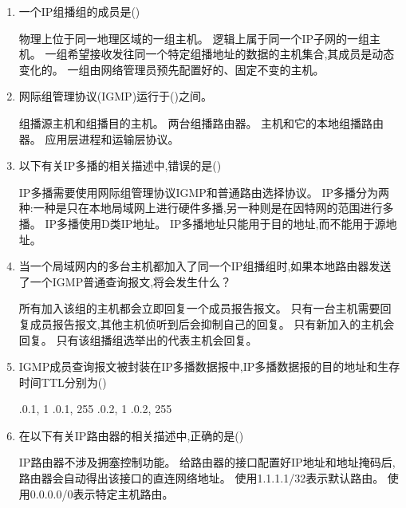 \documentclass[12pt, a4paper, oneside, UTF8]{ctexbook}
\begin{document}
\begin{enumerate}
    \item 一个IP组播组的成员是(\qquad)
    \begin{choices}[1]
    \task 物理上位于同一地理区域的一组主机。
    \task 逻辑上属于同一个IP子网的一组主机。
    \task 一组希望接收发往同一个特定组播地址的数据的主机集合,其成员是动态变化的。
    \task 一组由网络管理员预先配置好的、固定不变的主机。
    \end{choices}

    \item 网际组管理协议(IGMP)运行于()之间。
    \begin{choices}[1]
    \task 组播源主机和组播目的主机。
    \task 两台组播路由器。
    \task 主机和它的本地组播路由器。
    \task 应用层进程和运输层协议。
    \end{choices}

    \item 以下有关IP多播的相关描述中,错误的是(\qquad)
    \begin{choices}[1]
    \task IP多播需要使用网际组管理协议IGMP和普通路由选择协议。
    \task IP多播分为两种:一种是只在本地局域网上进行硬件多播,另一种则是在因特网的范围进行多播。
    \task IP多播使用D类IP地址。
    \task IP多播地址只能用于目的地址,而不能用于源地址。
    \end{choices}

    \item 当一个局域网内的多台主机都加入了同一个IP组播组时,如果本地路由器发送了一个IGMP普通查询报文,将会发生什么？
    \begin{choices}[1]
    \task 所有加入该组的主机都会立即回复一个成员报告报文。
    \task 只有一台主机需要回复成员报告报文,其他主机侦听到后会抑制自己的回复。
    \task 只有新加入的主机会回复。
    \task 只有该组播组选举出的代表主机会回复。
    \end{choices}

    \item IGMP成员查询报文被封装在IP多播数据报中,IP多播数据报的目的地址和生存时间TTL分别为(\qquad)
    \begin{choices}[2]
    .0.1, 1
    .0.1, 255
    .0.2, 1
    .0.2, 255
    \end{choices}

    \item 在以下有关IP路由器的相关描述中,正确的是(\qquad)
    \begin{choices}[1]
    \task IP路由器不涉及拥塞控制功能。
    \task 给路由器的接口配置好IP地址和地址掩码后,路由器会自动得出该接口的直连网络地址。
    \task 使用1.1.1.1/32表示默认路由。
    \task 使用0.0.0.0/0表示特定主机路由。
    \end{choices}


\end{enumerate}
\end{document}
